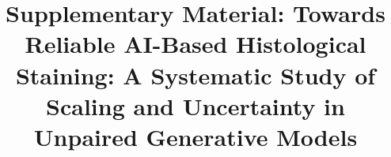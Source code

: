 \documentclass{bmvc2k}
\title{Supplementary Material: Towards Reliable AI-Based Histological Staining: 
A Systematic Study of Scaling and Uncertainty in Unpaired Generative Models}
\begin{document}
\renewcommand{\thefigure}{S\arabic{figure}}
\renewcommand{\thetable}{S\arabic{table}}

\maketitle




\end{document}
